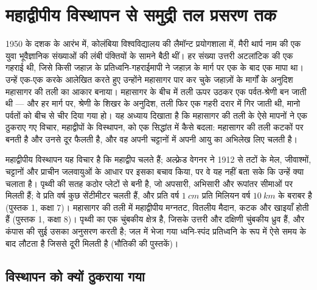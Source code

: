 \chapter{महाद्वीपीय विस्थापन से समुद्री तल प्रसरण तक}\label{ch:g11:drift-to-spreading}

1950 के दशक के आरंभ में, कोलंबिया विश्वविद्यालय की लैमॉन्ट प्रयोगशाला में, मैरी थार्प नाम की
एक युवा भूवैज्ञानिक संख्याओं की लंबी पंक्तियों के सामने बैठी थीं। हर संख्या उत्तरी
अटलांटिक की एक गहराई थी, जिसे किसी जहाज़ के प्रतिध्वनि-गहराईमापी ने जहाज़ के मार्ग पर एक के बाद
एक मापा था। उन्हें एक-एक करके आलेखित करते हुए उन्होंने महासागर पार कर चुके जहाज़ों के मार्गों
के अनुदिश महासागर की तली का आकार बनाया। महासागर के बीच में तली ऊपर उठकर
एक पर्वत-श्रेणी बन जाती थी --- और हर मार्ग पर, श्रेणी के शिखर के अनुदिश,
तली फिर एक गहरी दरार में गिर जाती थी, मानो पर्वतों को बीच से
चीर दिया गया हो। यह अध्याय दिखाता है कि महासागर की तली के ऐसे मापनों ने
एक ठुकराए गए विचार, महाद्वीपों के विस्थापन, को एक सिद्धांत में कैसे बदला: महासागर की तली
कटकों पर बनती है और उनसे दूर फैलती है, और वह अपनी चट्टानों में
अपनी आयु का अभिलेख लिए चलती है।

\begin{recall}
महाद्वीपीय विस्थापन यह विचार है कि महाद्वीप चलते हैं; अल्फ़्रेड वेगनर ने
1912 से तटों के मेल, जीवाश्मों, चट्टानों और प्राचीन
जलवायुओं के आधार पर इसका बचाव किया, पर वे यह नहीं बता सके कि उन्हें क्या चलाता है। पृथ्वी की सतह
कठोर प्लेटों से बनी है, जो अपसारी, अभिसारी और रूपांतर सीमाओं पर मिलती हैं;
वे प्रति वर्ष कुछ सेंटीमीटर चलती हैं, और प्रति वर्ष $\qty{1}{cm}$ प्रति मिलियन वर्ष $\qty{10}{km}$
के बराबर है (पुस्तक 1, कक्षा 7)। महासागर की तली में महाद्वीपीय
मग्नतट, वितलीय मैदान, कटक और खाइयाँ होती हैं (पुस्तक 1, कक्षा 8)।
पृथ्वी का एक चुंबकीय क्षेत्र है, जिसके उत्तरी और दक्षिणी चुंबकीय ध्रुव हैं, और
कंपास की सुई उसका अनुसरण करती है; जल में भेजा गया ध्वनि-स्पंद प्रतिध्वनि के रूप में
ऐसे समय के बाद लौटता है जिससे दूरी मिलती है (भौतिकी की पुस्तकें)।
\end{recall}

\section{विस्थापन को क्यों ठुकराया गया}

